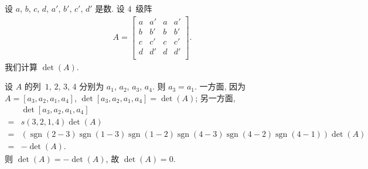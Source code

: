 \documentclass[../libro.tex]{subfiles}
\begin{document}
\begin{example}
    设 \(a\), \(b\), \(c\), \(d\),
    \(a'\), \(b'\), \(c'\), \(d'\) 是数.
    设 \(4\)~级阵
    \begin{align*}
        A =
        \begin{bmatrix}
            a & a' & a & a' \\
            b & b' & b & b' \\
            c & c' & c & c' \\
            d & d' & d & d' \\
        \end{bmatrix}.
    \end{align*}
    我们计算 \(\det {(A)}\).

    设 \(A\) 的列~\(1\), \(2\), \(3\), \(4\)
    分别为 \(a_1\), \(a_2\), \(a_3\), \(a_4\).
    则 \(a_3 = a_1\).
    一方面, 因为 \(A = [a_3, a_2, a_1, a_4]\),
    \(\det {[a_3, a_2, a_1, a_4]} = \det {(A)}\);
    另一方面,
    \begin{align*}
        &
        \det {[a_3, a_2, a_1, a_4]}
        \\
        = {} &
        s(3, 2, 1, 4) \det {(A)}
        \\
        = {} &
        (
            \operatorname{sgn} {(2 - 3)}
            \operatorname{sgn} {(1 - 3)}
            \operatorname{sgn} {(1 - 2)}
            \operatorname{sgn} {(4 - 3)}
            \operatorname{sgn} {(4 - 2)}
            \operatorname{sgn} {(4 - 1)}
        ) \det {(A)}
        \\
        = {} &
        {-\det {(A)}}.
    \end{align*}
    则 \(\det {(A)} = -\det {(A)}\),
    故 \(\det {(A)} = 0\).
\end{example}
\end{document}

